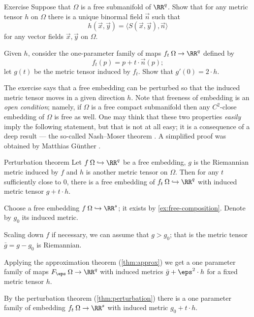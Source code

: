 \begin{thm}{Exercise}\label{ex:binormal}
Suppose that $\Omega$ is a free submanifold of $\RR^q$.
Show that for any metric tensor $h$ on $\Omega$ there is a unique binormal field $\vec n$ such  that 
\[h(\vec x,\vec y)=\langle S(\vec x,\vec y),\vec n\rangle\]
for any vector fields $\vec x,\vec y$ on $\Omega$.

Given $h$, consider the one-parameter family of maps $f_t\:\Omega \to \RR^q$ defined by 
\[f_t(p)= p+t\cdot \vec n(p);\]
let $g(t)$ be the metric tensor induced by $f_t$.
Show that $g'(0)=2\cdot h$.
\end{thm}

The exercise says that a free embedding can be perturbed so that the induced metric tensor moves in a given direction $h$.
Note that freeness of embedding is an \emph{open condition};
namely, if $\Omega$ is a free compact submanifold then any $C^2$-close embedding of $\Omega$ is free as well.
One may think that these two properties \emph{easily} imply the following statement,
but that is not at all easy;
it is a consequence of a deep result --- the so-called Nash--Moser theorem \cite{moser-1961}.
A simplified proof was obtained by Matthias G\"{u}nther \cite{gunter}.

\begin{thm}{Perturbation theorem}\label{thm:perturbation}
Let $f\:\Omega \hookrightarrow\RR^q$ be a free embedding, $g$ is the Riemannian metric induced by $f$ and $h$ is another metric tensor on $\Omega$.
Then for any $t$ sufficiently close to $0$, there is a free embedding of $f_t\:\Omega \hookrightarrow\RR^q$ with  induced metric tensor $g+t\cdot h$.  
\end{thm}

Choose a free embedding $f\: \Omega \hookrightarrow\RR^s$;
it exists by \ref{ex:free-composition}.
Denote by $g_0$ its induced metric.

Scaling down $f$ if necessary, we can assume that $g>g_0$;
that is the metric tensor $\bar g= g-g_0$ is Riemannian.

Applying the approximation theorem (\ref{thm:approx}) we get a one parameter family of maps $F_\eps\:\Omega \to \RR^q$ with induced metrics $\bar g+\eps^2\cdot h$ for a fixed metric tensor $h$.

By the perturbation theorem (\ref{thm:perturbation}) there is a one parameter family of embedding $f_t\:\Omega \to \RR^s$ with induced metric $g_0+t\cdot h$.

